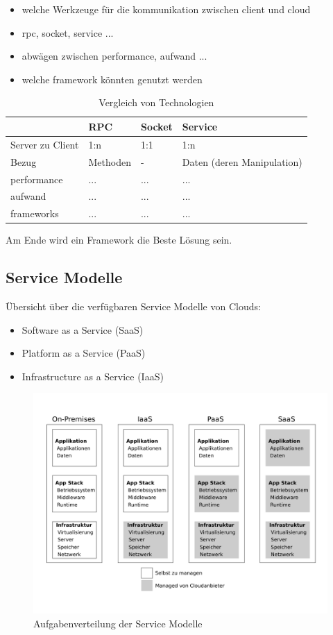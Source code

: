 \documentclass[a4paper,10pt]{article}
\numberwithin{figure}{section}
\numberwithin{table}{section}
\begin{document}
\begin{itemize}
 \item welche Werkzeuge für die kommunikation zwischen client und cloud
 \item rpc, socket, service ...
 \item abwägen zwischen performance, aufwand ...
 \item welche framework könnten genutzt werden
\end{itemize}

\begin{table}[H]
\centering
\caption{Vergleich von Technologien}
\label{my-label}
\renewcommand{\arraystretch}{1.5}
\begin{tabular}{p{2.3cm} p{2.8cm} p{2.8cm} p{2.8cm}}
\hline
 & RPC & Socket & Service\\
\hline
Server zu Client & 1:n & 1:1 & 1:n \\
Bezug & Methoden & - & Daten (deren Manipulation)\\
performance & ... & ... & ...\\
aufwand & ... & ... & ...\\
frameworks & ... & ... & ...\\
\hline
\end{tabular}
\end{table}

Am Ende wird ein Framework die Beste Lösung sein.

\subsection{Service Modelle}

Übersicht über die verfügbaren Service Modelle von Clouds:
\begin{itemize}
 \item Software as a Service (SaaS)
 \item Platform as a Service (PaaS)
 \item Infrastructure as a Service (IaaS)
\end{itemize}

\begin{figure}[htbp]
\centering
\caption{Aufgabenverteilung der Service Modelle}
\label{fig:modelsManaged}
\includegraphics[width=\textwidth]{graphics/modelsManagedNoCaption}
\end{figure}
\end{document}
